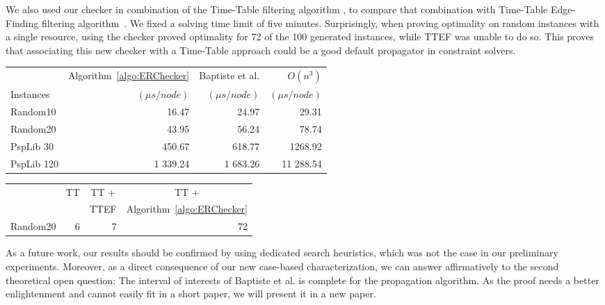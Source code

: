 \documentclass{llncs}
\begin{document}
We also used our checker in combination of the Time-Table filtering algorithm \cite{Letort:ScalableSweep}, to compare that combination with Time-Table Edge-Finding filtering algorithm~\cite{Vilim2011TTEF}.  
We fixed a solving time limit of five minutes. 
Surprisingly, when proving optimality on random instances with a single resource, using the checker proved optimality for 72 of the 100 generated instances, while TTEF was unable to do so. 
This proves that associating this new checker with a Time-Table approach could be a good default propagator in constraint solvers. 
\vspace{-0.5cm}
\begin{table}[!ht]
{\scriptsize
\begin{minipage}{.5\textwidth}
\centering
\begin{tabular}{|l|r|r|r|}\cline{2-4}
\multicolumn{1}{r|}{}& Algorithm~\ref{algo:ERChecker} & Baptiste et al. &$O(n^3)$ \\
\multicolumn{1}{l|}{Instances} & $(\mu s/node)$ & $(\mu s/node)$ & $(\mu s/node)$ \\ \hline
Random10 &16.47&24.97&29.31\\ 
Random20 &43.95&56.24&78.74\\ \hline
PspLib 30 &450.67&618.77&1268.92\\ 
PspLib 120 &1 339.24&1 683.26&11 288.54\\ \hline
\end{tabular}
\end{minipage}
\begin{minipage}{.5\textwidth}
\centering
\begin{tabular}{|l|r|r|r|}\cline{2-4}
\multicolumn{1}{r|}{}&\multicolumn{1}{c|}{TT}  &\multicolumn{1}{c|}{TT + }&\multicolumn{1}{c|}{TT +} \\
\multicolumn{1}{l|}{} &  & TTEF & Algorithm~\ref{algo:ERChecker}  \\ \hline
Random20 &6&7&72\\ \hline
\end{tabular}
\end{minipage}
}
\end{table}

\vspace{-1.1cm}
As a future work, our results should be confirmed by using dedicated search heuristics, which was not the case in our preliminary experiments. 
Moreover, as a direct consequence of our new case-based characterization, we can answer affirmatively to the second theoretical open question: The interval of interests of Baptiste et al. is complete for the propagation algorithm. As the proof needs a better enlightenment 
and cannot easily fit in a short paper, we will present it in a new paper. 
\linespread{0.96}

\end{document}
